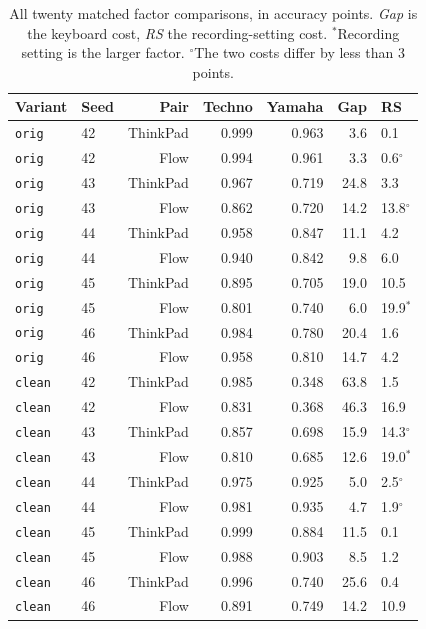 \documentclass[pdflatex,sn-mathphys-num]{sn-jnl}
\begin{document}
\begin{table}[t]
\caption{All twenty matched factor comparisons, in accuracy points. \emph{Gap} is the keyboard cost, \emph{RS} the recording-setting cost. $^\ast$Recording setting is the larger factor. $^\circ$The two costs differ by less than 3 points.}\label{tab:esm-factors}
\setlength{\tabcolsep}{4pt}
\begin{tabular}{@{}llrrrrl@{}}
\toprule
Variant & Seed & Pair & Techno & Yamaha & Gap & RS \\
\midrule
\texttt{orig} & 42 & ThinkPad & 0.999 & 0.963 & 3.6 & 0.1 \\
\texttt{orig} & 42 & Flow & 0.994 & 0.961 & 3.3 & 0.6$^\circ$ \\
\texttt{orig} & 43 & ThinkPad & 0.967 & 0.719 & 24.8 & 3.3 \\
\texttt{orig} & 43 & Flow & 0.862 & 0.720 & 14.2 & 13.8$^\circ$ \\
\texttt{orig} & 44 & ThinkPad & 0.958 & 0.847 & 11.1 & 4.2 \\
\texttt{orig} & 44 & Flow & 0.940 & 0.842 & 9.8 & 6.0 \\
\texttt{orig} & 45 & ThinkPad & 0.895 & 0.705 & 19.0 & 10.5 \\
\texttt{orig} & 45 & Flow & 0.801 & 0.740 & 6.0 & 19.9$^\ast$ \\
\texttt{orig} & 46 & ThinkPad & 0.984 & 0.780 & 20.4 & 1.6 \\
\texttt{orig} & 46 & Flow & 0.958 & 0.810 & 14.7 & 4.2 \\
\texttt{clean} & 42 & ThinkPad & 0.985 & 0.348 & 63.8 & 1.5 \\
\texttt{clean} & 42 & Flow & 0.831 & 0.368 & 46.3 & 16.9 \\
\texttt{clean} & 43 & ThinkPad & 0.857 & 0.698 & 15.9 & 14.3$^\circ$ \\
\texttt{clean} & 43 & Flow & 0.810 & 0.685 & 12.6 & 19.0$^\ast$ \\
\texttt{clean} & 44 & ThinkPad & 0.975 & 0.925 & 5.0 & 2.5$^\circ$ \\
\texttt{clean} & 44 & Flow & 0.981 & 0.935 & 4.7 & 1.9$^\circ$ \\
\texttt{clean} & 45 & ThinkPad & 0.999 & 0.884 & 11.5 & 0.1 \\
\texttt{clean} & 45 & Flow & 0.988 & 0.903 & 8.5 & 1.2 \\
\texttt{clean} & 46 & ThinkPad & 0.996 & 0.740 & 25.6 & 0.4 \\
\texttt{clean} & 46 & Flow & 0.891 & 0.749 & 14.2 & 10.9 \\
\bottomrule
\end{tabular}
\end{table}
\end{document}
